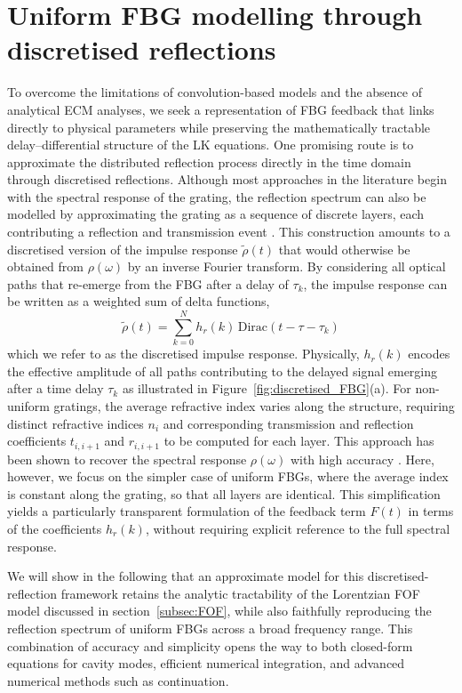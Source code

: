 \section{Uniform FBG modelling through discretised reflections}
\label{sec:FBG_discretised}
%
To overcome the limitations of convolution-based models and the absence of analytical ECM analyses, we seek a representation of FBG feedback that links directly to physical parameters while preserving the mathematically tractable delay–differential structure of the LK equations.
One promising route is to approximate the distributed reflection process directly in the time domain through discretised reflections.
Although most approaches in the literature begin with the spectral response of the grating, the reflection spectrum can also be modelled by approximating the grating as a sequence of discrete layers, each contributing a reflection and transmission event \cite{poladian2000simple, ghiringhelli2002time, feced2002efficient, skaar2001synthesis}. 
This construction amounts to a discretised version of the impulse response $\tilde{\rho}(t)$ that would otherwise be obtained from $\rho(\omega)$ by an inverse Fourier transform. 
By considering all optical paths that re-emerge from the FBG after a delay of $\tau_k$, the impulse response can be written as a weighted sum of delta functions,
%
\begin{equation}
    \label{eq:dicretised_impulse}
    \tilde{\rho}(t) = \sum_{k=0}^N h_r(k)\, \text{Dirac}(t-\tau-\tau_k)
\end{equation}
%
which we refer to as the discretised impulse response.
Physically, $h_r(k)$ encodes the effective amplitude of all paths contributing to the delayed signal emerging after a time delay $\tau_k$ as illustrated in Figure~\ref{fig:discretised_FBG}(a).
For non-uniform gratings, the average refractive index varies along the structure, requiring distinct refractive indices $n_i$ and corresponding transmission and reflection coefficients $t_{i,i+1}$ and $r_{i,i+1}$ to be computed for each layer.
This approach has been shown to recover the spectral response $\rho(\omega)$ with high accuracy \cite{ghiringhelli2002time}.
Here, however, we focus on the simpler case of uniform FBGs, where the average index is constant along the grating, so that all layers are identical.
This simplification yields a particularly transparent formulation of the feedback term $F(t)$ in terms of the coefficients $h_r(k)$, without requiring explicit reference to the full spectral response.
%
\par
%
We will show in the following that an approximate model for this discretised-reflection framework retains the analytic tractability of the Lorentzian FOF model discussed in section~\ref{subsec:FOF}, while also faithfully reproducing the reflection spectrum of uniform FBGs across a broad frequency range. 
This combination of accuracy and simplicity opens the way to both closed-form equations for cavity modes, efficient numerical integration, and advanced numerical methods such as continuation.
%
%
